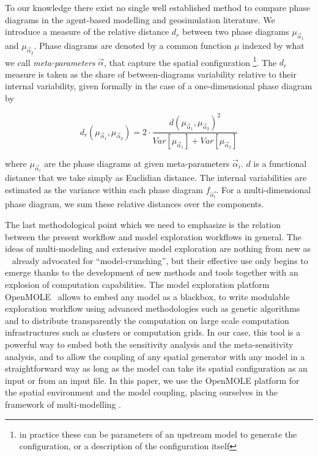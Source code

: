 \documentclass[3p,times,procedia]{elsarticle}
\begin{document}
To our knowledge there exist no single well established method to compare phase diagrams in the agent-based modelling and geosimulation literature. We introduce a measure of the relative distance $d_r$ between two phase diagrams $\mu_{\vec{\alpha}_1}$ and $\mu_{\vec{\alpha}_2}$. Phase diagrams are denoted by a common function $\mu$ indexed by what we call \emph{meta-parameters} $\vec{\alpha}$, that capture the spatial configuration \footnote{in practice these can be parameters of an upstream model to generate the configuration, or a description of the configuration itself}. The $d_r$ measure is taken as the share of between-diagrams variability relative to their internal variability, given formally in the case of a one-dimensional phase diagram by


\begin{equation}\label{eq:phase-distance}
d_r\left(\mu_{\vec{\alpha}_1},\mu_{\vec{\alpha}_2}\right) = 2 \cdot \frac{d(\mu_{\vec{\alpha}_1},\mu_{\vec{\alpha}_2})^2}{Var\left[\mu_{\vec{\alpha}_1}\right] + Var\left[\mu_{\vec{\alpha}_2}\right]}
\end{equation}

where $\mu_{\vec{\alpha}_i}$ are the phase diagrams at given meta-parameters $\vec{\alpha}_i$. $d$ is a functional distance that we take simply as Euclidian distance. The internal variabilities are estimated as the variance within each phase diagram $f_{\vec{\alpha_i}}$. For a multi-dimensional phase diagram, we sum these relative distances over the components. 

The last methodological point which we need to emphasize is the relation between the present workflow and model exploration workflows in general. The ideas of multi-modeling and extensive model exploration are nothing from new as ~\cite{openshaw1983data} already advocated for ``model-crunching'', but their effective use only begins to emerge thanks to the development of new methods and tools together with an explosion of computation capabilities. The model exploration platform OpenMOLE~\citep{reuillon2013openmole} allows to embed any model as a blackbox, to write modulable exploration workflow using advanced methodologies such as genetic algorithms and to distribute transparently the computation on large scale computation infrastructures such as clusters or computation grids. In our case, this tool is a powerful way to embed both the sensitivity analysis and the meta-sensitivity analysis, and to allow the coupling of any spatial generator with any model in a straightforward way as long as the model can take its spatial configuration as an input or from an input file. In this paper, we use the OpenMOLE platform for the spatial environment and the model coupling, placing ourselves in the  framework of multi-modelling \citep{cottineau2015modular}. 
\end{document}
